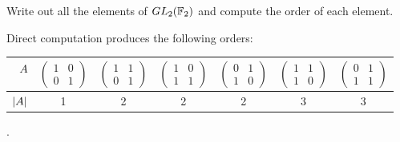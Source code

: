  Write out all the elements of $GL_2(\mathbb{F}_2)$ and compute the
order of each element.
\begin{solution}
  Direct computation produces the following orders:
  \begin{center}
    \begin{tabular}{r|c|c|c|c|c|c}
      $A$
      &
      $\begin{pmatrix}
        1 & 0 \\ 0 & 1
      \end{pmatrix}$
      &
      $\begin{pmatrix}
        1 & 1 \\ 0 & 1
      \end{pmatrix}$
      &
      $\begin{pmatrix}
        1 & 0 \\ 1 & 1
      \end{pmatrix}$
      &
      $\begin{pmatrix}
        0 & 1 \\ 1 & 0
      \end{pmatrix}$
      &
      $\begin{pmatrix}
        1 & 1 \\ 1 & 0
      \end{pmatrix}$
      &
      $\begin{pmatrix}
        0 & 1 \\ 1 & 1
      \end{pmatrix}$
      \\ \hline
      $\lvert{A}\rvert$ & 1 & 2 & 2 & 2 & 3 & 3
    \end{tabular}.
  \end{center}
\end{solution}

